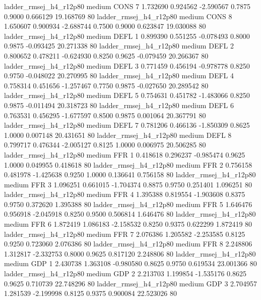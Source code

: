ladder_rmsej_h4_r12p80     medium     CONS                 7  1.732690 0.924562 -2.590567 0.7875 0.9000  0.666129   19.168769 80
ladder_rmsej_h4_r12p80     medium     CONS                 8  1.650607 0.900934 -2.688744 0.7500 0.9000  0.623847   19.030088 80
ladder_rmsej_h4_r12p80     medium     DEFL                 1  0.899390 0.551255 -0.078493 0.8000 0.9875 -0.093425   20.271338 80
ladder_rmsej_h4_r12p80     medium     DEFL                 2  0.800652 0.478211 -0.624930 0.8250 0.9625 -0.079459   20.266367 80
ladder_rmsej_h4_r12p80     medium     DEFL                 3  0.771459 0.456194 -0.978778 0.8250 0.9750 -0.048022   20.270995 80
ladder_rmsej_h4_r12p80     medium     DEFL                 4  0.758314 0.451656 -1.257467 0.7750 0.9875 -0.027650   20.289542 80
ladder_rmsej_h4_r12p80     medium     DEFL                 5  0.754631 0.451782 -1.483066 0.8250 0.9875 -0.011494   20.318723 80
ladder_rmsej_h4_r12p80     medium     DEFL                 6  0.763531 0.456295 -1.677597 0.8500 0.9875  0.001064   20.367791 80
ladder_rmsej_h4_r12p80     medium     DEFL                 7  0.781206 0.466136 -1.850309 0.8625 1.0000  0.007148   20.431651 80
ladder_rmsej_h4_r12p80     medium     DEFL                 8  0.799717 0.476344 -2.005127 0.8125 1.0000  0.006975   20.506285 80
ladder_rmsej_h4_r12p80     medium      FFR                 1  0.418618 0.296237 -0.985474 0.9625 1.0000  0.049955    0.418618 80
ladder_rmsej_h4_r12p80     medium      FFR                 2  0.756158 0.481978 -1.425638 0.9250 1.0000  0.136641    0.756158 80
ladder_rmsej_h4_r12p80     medium      FFR                 3  1.096251 0.661015 -1.704374 0.8875 0.9750  0.251401    1.096251 80
ladder_rmsej_h4_r12p80     medium      FFR                 4  1.395388 0.819554 -1.903608 0.8375 0.9750  0.372620    1.395388 80
ladder_rmsej_h4_r12p80     medium      FFR                 5  1.646476 0.956918 -2.045918 0.8250 0.9500  0.506814    1.646476 80
ladder_rmsej_h4_r12p80     medium      FFR                 6  1.872419 1.086183 -2.158532 0.8250 0.9375  0.622299    1.872419 80
ladder_rmsej_h4_r12p80     medium      FFR                 7  2.076386 1.205582 -2.253585 0.8125 0.9250  0.723060    2.076386 80
ladder_rmsej_h4_r12p80     medium      FFR                 8  2.248806 1.312817 -2.332753 0.8000 0.9625  0.817120    2.248806 80
ladder_rmsej_h4_r12p80     medium      GDP                 1  2.430738 1.363108 -0.980580 0.8625 0.9750  0.619534   23.001366 80
ladder_rmsej_h4_r12p80     medium      GDP                 2  2.213703 1.199854 -1.535176 0.8625 0.9625  0.710739   22.748296 80
ladder_rmsej_h4_r12p80     medium      GDP                 3  2.704957 1.281539 -2.199998 0.8125 0.9375  0.900084   22.523026 80
